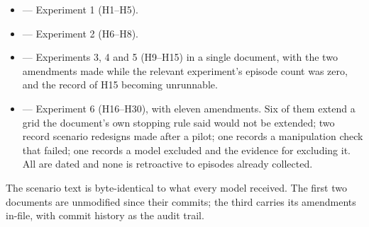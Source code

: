 \documentclass[11pt]{article}
\begin{document}
\begin{itemize}\itemsep1pt
\item {} --- Experiment 1 (H1--H5).
\item {} --- Experiment 2 (H6--H8).
\item {} --- Experiments 3, 4 and 5 (H9--H15)
  in a single document, with the two amendments made while the relevant
  experiment's episode count was zero, and the record of H15 becoming
  unrunnable.
\item {} --- Experiment 6 (H16--H30), with
  eleven amendments. Six of them extend a grid the document's own stopping rule
  said would not be extended; two record scenario redesigns made after a pilot;
  one records a manipulation check that failed; one records a model excluded and
  the evidence for excluding it. All are dated and none is retroactive to
  episodes already collected.
\end{itemize}

The scenario text is byte-identical to what every model received. The first two
documents are unmodified since their commits; the third carries its amendments
in-file, with commit history as the audit trail.
\end{document}
